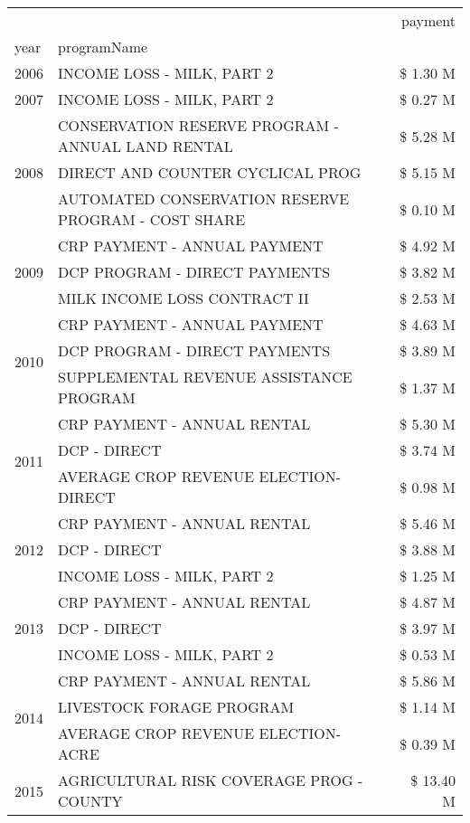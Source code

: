 \begin{tabular}{llr}
\toprule
 &  & payment \\
year & programName &  \\
\midrule
2006 & INCOME LOSS - MILK, PART 2 & \$ 1.30 M \\
\cline{1-3}
2007 & INCOME LOSS - MILK, PART 2 & \$ 0.27 M \\
\cline{1-3}
\multirow[t]{3}{*}{2008} & CONSERVATION RESERVE PROGRAM - ANNUAL LAND RENTAL & \$ 5.28 M \\
 & DIRECT AND COUNTER CYCLICAL PROG & \$ 5.15 M \\
 & AUTOMATED CONSERVATION RESERVE PROGRAM - COST SHARE & \$ 0.10 M \\
\cline{1-3}
\multirow[t]{3}{*}{2009} & CRP PAYMENT - ANNUAL PAYMENT & \$ 4.92 M \\
 & DCP PROGRAM - DIRECT PAYMENTS & \$ 3.82 M \\
 & MILK INCOME LOSS CONTRACT II & \$ 2.53 M \\
\cline{1-3}
\multirow[t]{3}{*}{2010} & CRP PAYMENT - ANNUAL PAYMENT & \$ 4.63 M \\
 & DCP PROGRAM - DIRECT PAYMENTS & \$ 3.89 M \\
 & SUPPLEMENTAL REVENUE ASSISTANCE PROGRAM & \$ 1.37 M \\
\cline{1-3}
\multirow[t]{3}{*}{2011} & CRP PAYMENT - ANNUAL RENTAL & \$ 5.30 M \\
 & DCP - DIRECT & \$ 3.74 M \\
 & AVERAGE CROP REVENUE ELECTION-DIRECT & \$ 0.98 M \\
\cline{1-3}
\multirow[t]{3}{*}{2012} & CRP PAYMENT - ANNUAL RENTAL & \$ 5.46 M \\
 & DCP - DIRECT & \$ 3.88 M \\
 & INCOME LOSS - MILK, PART 2 & \$ 1.25 M \\
\cline{1-3}
\multirow[t]{3}{*}{2013} & CRP PAYMENT - ANNUAL RENTAL & \$ 4.87 M \\
 & DCP - DIRECT & \$ 3.97 M \\
 & INCOME LOSS - MILK, PART 2 & \$ 0.53 M \\
\cline{1-3}
\multirow[t]{3}{*}{2014} & CRP PAYMENT - ANNUAL RENTAL & \$ 5.86 M \\
 & LIVESTOCK FORAGE PROGRAM & \$ 1.14 M \\
 & AVERAGE CROP REVENUE ELECTION-ACRE & \$ 0.39 M \\
\cline{1-3}
\multirow[t]{3}{*}{2015} & AGRICULTURAL RISK COVERAGE PROG - COUNTY & \$ 13.40 M \\

\end{tabular}
